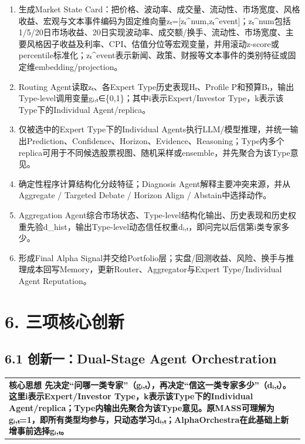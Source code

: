 \documentclass[12pt,a4paper]{ctexart}
\begin{document}
\begin{enumerate}
\def\labelenumi{\arabic{enumi}.}
\item
  生成Market State
  Card：把价格、波动率、成交量、流动性、市场宽度、风格收益、宏观与文本事件编码为固定维向量zₜ={[}zₜ\^{}num,zₜ\^{}event{]}；zₜ\^{}num包括1/5/20日市场收益、20日实现波动率、成交额/换手、流动性、市场宽度、主要风格因子收益及利率、CPI、估值分位等宏观变量，并用滚动z-score或percentile标准化；zₜ\^{}event表示新闻、政策、财报等文本事件的类别特征或固定维embedding/projection。
\item
  Routing Agent读取zₜ、各Expert Type历史表现Hₜ、Profile
  P和预算Bₜ，输出Type-level调用变量gᵢ,ₜ∈\{0,1\}；其中i表示Expert/Investor
  Type，k表示该Type下的Individual Agent/replica。
\item
  仅被选中的Expert Type下的Individual
  Agents执行LLM/模型推理，并统一输出Prediction、Confidence、Horizon、Evidence、Reasoning；Type内多个replica可用于不同候选股票视图、随机采样或ensemble，并先聚合为该Type意见。
\item
  确定性程序计算结构化分歧特征；Diagnosis
  Agent解释主要冲突来源，并从Aggregate / Targeted Debate / Horizon Align
  / Abstain中选择动作。
\item
  Aggregation
  Agent综合市场状态、Type-level结构化输出、历史表现和历史权重先验d\_hist，输出Type-level动态信任权重dᵢ,ₜ，即问完以后信第i类专家多少。
\item
  形成Final Alpha
  Signal并交给Portfolio层；实盘/回测收益、风险、换手与推理成本回写Memory，更新Router、Aggregator与Expert
  Type/Individual Agent Reputation。
\end{enumerate}

\section{\texorpdfstring{\textbf{6.
三项核心创新}}{6. 三项核心创新}}\label{ux4e09ux9879ux6838ux5fc3ux521bux65b0}

\subsection{\texorpdfstring{\textbf{6.1 创新一：Dual-Stage Agent
Orchestration}}{6.1 创新一：Dual-Stage Agent Orchestration}}\label{ux521bux65b0ux4e00dual-stage-agent-orchestration}

\begin{longtable}[]{@{}
  >{\raggedright\arraybackslash}p{}@{}}
\toprule\noalign{}
\endhead
\bottomrule\noalign{}
\endlastfoot
\textbf{核心思想
先决定``问哪一类专家''（gᵢ,ₜ），再决定``信这一类专家多少''（dᵢ,ₜ）。这里i表示Expert/Investor
Type，k表示该Type下的Individual
Agent/replica；Type内输出先聚合为该Type意见。原MASS可理解为gᵢ,ₜ=1，即所有类型均参与，只动态学习dᵢ,ₜ；AlphaOrchestra在此基础上新增事前选择gᵢ,ₜ。} \\
\end{longtable}
\end{document}
